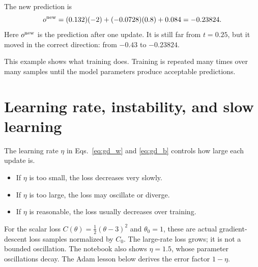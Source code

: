 \documentclass[11pt]{article}
\begin{document}
The new prediction is
\begin{equation}
    o^{\rm new}=(0.132)(-2)+(-0.0728)(0.8)+0.084=-0.23824.
    \label{eq:example_new_prediction}
\end{equation}
Here $o^{\rm new}$ is the prediction after one update.  It is still far from $t=0.25$, but it moved in the correct direction: from $-0.43$ to $-0.23824$.

This example shows what training does.  Training is repeated many times over many samples until the model parameters produce acceptable predictions.

\section{Learning rate, instability, and slow learning}

The learning rate $\eta$ in Eqs.~\eqref{eq:gd_w} and \eqref{eq:gd_b} controls how large each update is.

\begin{itemize}
    \item If $\eta$ is too small, the loss decreases very slowly.
    \item If $\eta$ is too large, the loss may oscillate or diverge.
    \item If $\eta$ is reasonable, the loss usually decreases over training.
\end{itemize}

\begin{center}
\end{center}
For the scalar loss $C(\theta)=\tfrac12(\theta-3)^2$ and $\theta_0=1$, these are actual gradient-descent loss samples normalized by $C_0$. The large-rate loss grows; it is not a bounded oscillation. The notebook also shows $\eta=1.5$, whose parameter oscillations decay. The Adam lesson below derives the error factor $1-\eta$.
\end{document}
